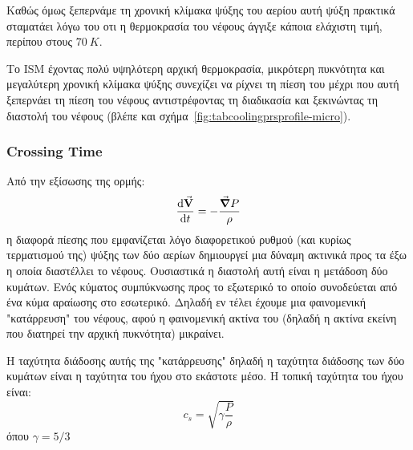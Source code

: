 		Καθώς όμως ξεπερνάμε τη χρονική κλίμακα ψύξης του αερίου αυτή ψύξη πρακτικά  σταματάει λόγω του οτι η θερμοκρασία του νέφους άγγιξε κάποια ελάχιστη τιμή, περίπου στους $\SI{70}{K}$. 

 	Το ISM έχοντας πολύ υψηλότερη αρχική θερμοκρασία, μικρότερη πυκνότητα και μεγαλύτερη χρονική κλίμακα ψύξης συνεχίζει να ρίχνει τη πίεση του μέχρι που αυτή ξεπερνάει τη πίεση του νέφους αντιστρέφοντας τη διαδικασία και ξεκινώντας τη διαστολή του νέφους (βλέπε και σχήμα~\ref{fig:tabcoolingprsprofile-micro}).
	



	

	\subsubsection{Crossing Time}
%	
	 Από την εξίσωσης της ορμής:
	\begin{equation}
	\dv{\va V}{t}=-\frac{\grad P}{\rho}
	\end{equation}
	η διαφορά πίεσης που εμφανίζεται λόγο διαφορετικού ρυθμού (και κυρίως τερματισμού της) ψύξης των δύο αερίων δημιουργεί μια δύναμη ακτινικά προς τα έξω η οποία διαστέλλει το νέφους. Ουσιαστικά η διαστολή αυτή είναι η μετάδοση δύο κυμάτων. Ενός κύματος συμπύκνωσης προς το εξωτερικό το οποίο συνοδεύεται από ένα κύμα αραίωσης στο εσωτερικό. Δηλαδή εν τέλει έχουμε μια φαινομενική "κατάρρευση" του νέφους, αφού η φαινομενική ακτίνα του (δηλαδή η ακτίνα εκείνη που διατηρεί την αρχική πυκνότητα) μικραίνει.
	 
	Η ταχύτητα διάδοσης αυτής της "κατάρρευσης" δηλαδή η ταχύτητα διάδοσης των δύο κυμάτων είναι η ταχύτητα του ήχου στο εκάστοτε μέσο. Η τοπική ταχύτητα του ήχου είναι:
	\begin{equation}
	c_s=\sqrt{\gamma \frac{P}{\rho}}
	\end{equation}
	όπου $\gamma = 5/3$
	
